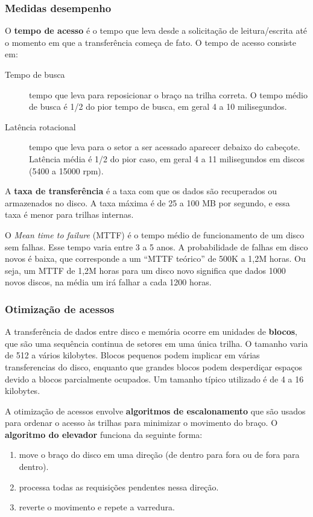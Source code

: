 \subsubsection{Medidas desempenho}

O \textbf{tempo de acesso} é o tempo que leva desde a solicitação de leitura/escrita
até o momento em que a transferência começa de fato. 
O tempo de acesso consiste em:
\begin{description}
\item[Tempo de busca] tempo que leva para reposicionar o braço na trilha correta.
O tempo médio de busca é 1/2 do pior tempo de busca, em geral 4 a 10 milisegundos.

\item[Latência rotacional] tempo que leva para o setor a ser acessado
aparecer debaixo do cabeçote. Latência média é 1/2 do pior caso, em geral
4 a 11 milisegundos em discos (5400 a 15000 rpm). 
\end{description}

A \textbf{taxa de transferência} é a taxa com que os dados são recuperados ou 
armazenados no disco. A taxa máxima é de 25 a 100 MB por segundo, e essa
taxa é menor para trilhas internas.

O \emph{Mean time to failure} (MTTF) é o tempo médio de funcionamento de um disco
sem falhas. 
Esse tempo varia entre 3 a 5 anos. 
A probabilidade de falhas em disco novos é baixa, que corresponde a um
``MTTF teórico'' de 500K a 1,2M horas.
Ou seja, um MTTF de 1,2M horas para um disco novo significa que dados 1000 novos discos,
na média um irá falhar a cada 1200 horas.

\subsubsection{Otimização de acessos}

A transferência de dados entre disco e memória ocorre em unidades de \textbf{blocos},
que são uma sequência continua de setores em uma única trilha.
O tamanho varia de 512 a vários kilobytes. Blocos pequenos podem implicar 
em várias transferencias do disco, enquanto que grandes blocos podem 
desperdiçar espaços devido a blocos parcialmente ocupados.
Um tamanho típico utilizado é de 4 a 16 kilobytes.

A otimização de acessos envolve \textbf{algoritmos de escalonamento} que são usados para ordenar o 
acesso às trilhas para minimizar o  movimento do braço.
O \textbf{algoritmo do elevador} funciona da seguinte forma:
\begin{enumerate}
\item move o braço do disco em uma direção (de dentro para fora ou de fora para dentro).
\item processa todas as requisições pendentes nessa direção.
\item reverte o movimento e repete a varredura.
\end{enumerate}

